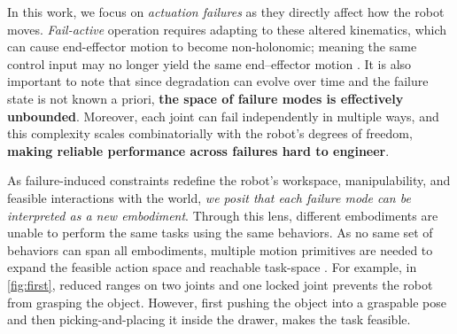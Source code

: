 In this work, we focus on \textit{actuation failures} as they directly affect how the robot moves. \textit{Fail-active} operation requires adapting to these altered kinematics, which can cause end-effector motion to become non-holonomic; meaning the same control input may no longer yield the same end–effector motion \cite{Bloch_Krishnaprasad_Murray_2016}. 
%
It is also important to note that since degradation can evolve over time \cite{barbieri2015sensor} and the failure state is not known a priori, \textbf{the space of failure modes is effectively unbounded}. Moreover, each joint can fail independently in multiple ways, and this complexity scales combinatorially with the robot’s degrees of freedom, \textbf{making reliable performance across failures hard to engineer}.

As failure-induced constraints redefine the robot's workspace, manipulability, and feasible interactions with the world, \textsl{we posit that each failure mode can be interpreted as a new embodiment}.  
Through this lens, different embodiments are unable to perform the same tasks using the same behaviors. As no same set of behaviors can span all embodiments, multiple motion primitives are needed to expand the feasible action space and reachable task-space \cite{briscoe2024exploring}.
For example, in \cref{fig:first}, reduced ranges on two joints and one locked joint prevents the robot from grasping the object. However, first pushing the object into a graspable pose and then picking-and-placing it inside the drawer, makes the task feasible.



